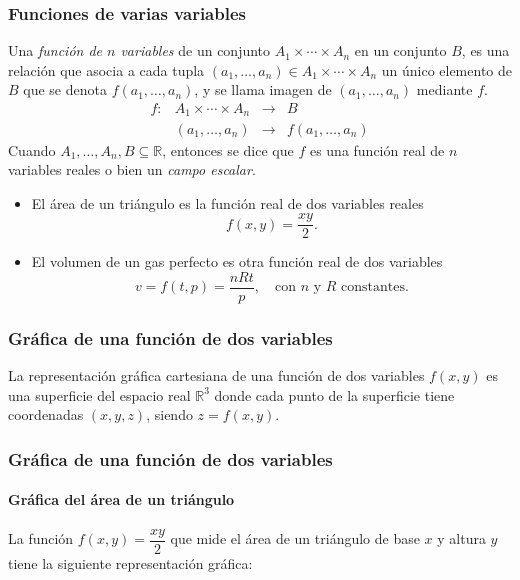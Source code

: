 \begin{frame}
\frametitle{Funciones de varias variables}
\begin{definicion}
Una \emph{función de $n$ variables} de un conjunto $A_1\times \cdots \times A_n$ en un conjunto $B$, es una relación que
asocia a cada tupla $(a_1,\ldots,a_n)\in A_1\times \cdots\times A_n$ un único elemento de $B$ que se denota
$f(a_1,\ldots,a_n)$, y se llama imagen de $(a_1,\ldots,a_n)$ mediante $f$.
\[
\begin{array}{lccc}
f: & A_1\times\cdots\times A_n & \longrightarrow & B\\
   &(a_1,\ldots,a_n) & \longrightarrow & f(a_1,\ldots,a_n)
\end{array}
\]
Cuando $A_1,\ldots,A_n,B\subseteq \mathbb{R}$, entonces se dice que $f$ es
una función real de $n$ variables reales o bien un \emph{campo escalar}.
\end{definicion}

\begin{itemize}
\item El área de un triángulo es la función real de dos variables reales 
\[ f(x,y)=\frac{xy}{2}.\]
\item El volumen de un gas perfecto es otra función real de dos variables
\[
v=f(t,p)=\frac{nRt}{p},\quad \mbox{con $n$ y $R$ constantes.}
\]
\end{itemize}
\end{frame}


\begin{frame}
\frametitle{Gráfica de una función de dos variables}
La representación gráfica cartesiana de una función de dos variables $f(x,y)$ es una superficie del espacio real
$\mathbb{R}^3$ donde cada punto de la superficie tiene coordenadas $(x,y,z)$, siendo $z=f(x,y)$.
\begin{center}
\scalebox{1}{}
\end{center}
\end{frame}


\begin{frame}
\frametitle{Gráfica de una función de dos variables}
\framesubtitle{Gráfica del área de un triángulo}
La función $f(x,y)=\dfrac{xy}{2}$ que mide el área de un triángulo de base $x$ y altura $y$ tiene la siguiente representación gráfica:
\begin{center}
\scalebox{1}{}
\end{center}
\end{frame}


